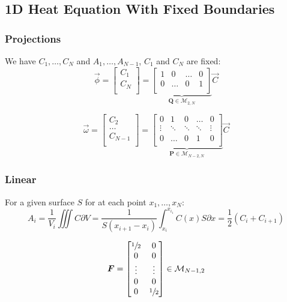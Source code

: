 \documentclass[aps,onecolumn,11pt]{revtex4}
\newcommand{\half}{{\sfrac{1}{2}}}
\newcommand{\mat}[1]{{\bm{#1}}}
\begin{document}
\subsection{1D Heat Equation With Fixed Boundaries}
\subsubsection{Projections}
We have $C_1,\ldots,C_N$ and $A_1,\ldots,A_{N-1}$, $C_1$ and $C_N$ are fixed:
\begin{equation}
	\vec{\phi}=
	\begin{bmatrix}
	C_1\\
	C_N\\
	\end{bmatrix}
	= 
	\underbrace{
	\begin{bmatrix}
	1 & 0 & \ldots & 0\\
 	0 & \ldots & 0 & 1\\
	\end{bmatrix}}_{\mat{Q} \in \mathcal{M}_{2,N}}
	\vec{C}
\end{equation}


\begin{equation}
	\vec{\omega}=
	\begin{bmatrix}
	C_2\\
	\ldots\\
	C_{N-1}\\
	\end{bmatrix}
	= 
	\underbrace{
	\begin{bmatrix}
	0 & 1 & 0 & \ldots & 0 \\
	\vdots & \ddots & \ddots & \ddots & \vdots \\
     0 & \ldots & 0 & 1 & 0\\
 	\end{bmatrix}}_{\mat{P} \in \mathcal{M}_{N-2,N}}
	\vec{C}
\end{equation}

\subsubsection{Linear}

For a given surface $S$ for at each point $x_1,\ldots,x_N$:
\begin{equation}
	A_i = \dfrac{1}{V_i} \iiint C \partial V = \dfrac{1}{S(x_{i+1}-x_i)} \int_{x_i}^{x_{i_1}} C(x) S \partial x = \dfrac{1}{2}\left(C_{i}+C_{i+1}\right)
\end{equation}


\begin{equation}
	\mat{F} = 
	\begin{bmatrix}
	\half & 0\\
	0     & 0\\
	\vdots & \vdots\\
	0      & 0\\
	0      & \half\\
	\end{bmatrix} \in \mathcal{M}_{N-1,2}
\end{equation}
\end{document}
